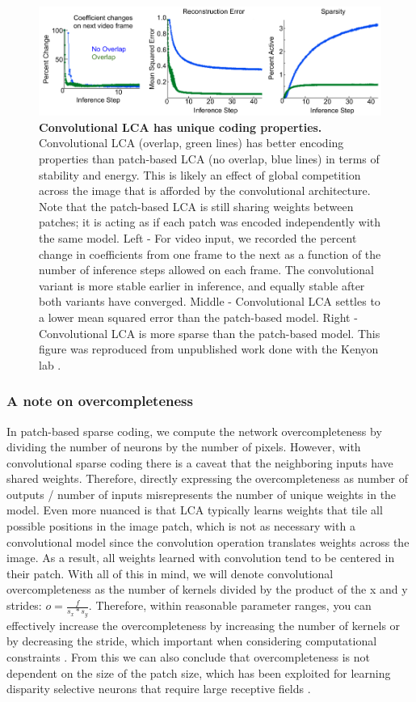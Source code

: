 \begin{figure}[h]\label{fig:ch2_lca_conv_benefit}
    \centering
    \includegraphics[width=\textwidth]{figures/lca_conv_benefits.png}
    \caption{\textbf{Convolutional LCA has unique coding properties.} Convolutional LCA (overlap, green lines) has better encoding properties than patch-based LCA (no overlap, blue lines) in terms of stability and energy. This is likely an effect of global competition across the image that is afforded by the convolutional architecture. Note that the patch-based LCA is still sharing weights between patches; it is acting as if each patch was encoded independently with the same model. Left - For video input, we recorded the percent change in coefficients from one frame to the next as a function of the number of inference steps allowed on each frame. The convolutional variant is more stable earlier in inference, and equally stable after both variants have converged. Middle - Convolutional LCA settles to a lower mean squared error than the patch-based model. Right - Convolutional LCA is more sparse than the patch-based model. This figure was reproduced from unpublished work done with the Kenyon lab \parencite{paiton2013deep}.}
\end{figure}


\subsubsection{A note on overcompleteness}
In patch-based sparse coding, we compute the network overcompleteness by dividing the number of neurons by the number of pixels. However, with convolutional sparse coding there is a caveat that the neighboring inputs have shared weights. Therefore, directly expressing the overcompleteness as number of outputs / number of inputs misrepresents the number of unique weights in the model. Even more nuanced is that LCA typically learns weights that tile all possible positions in the image patch, which is not as necessary with a convolutional model since the convolution operation translates weights across the image. As a result, all weights learned with convolution tend to be centered in their patch. With all of this in mind, we will denote convolutional overcompleteness as the number of kernels divided by the product of the x and y strides: $o = \tfrac{f}{s_{x}*s_{y}}$. Therefore, within reasonable parameter ranges, you can effectively increase the overcompleteness by increasing the number of kernels or by decreasing the stride, which important when considering computational constraints \parencite{schultz2014replicating}. From this we can also conclude that overcompleteness is not dependent on the size of the patch size, which has been exploited for learning disparity selective neurons that require large receptive fields \parencite{lundquist2016sparse}.


